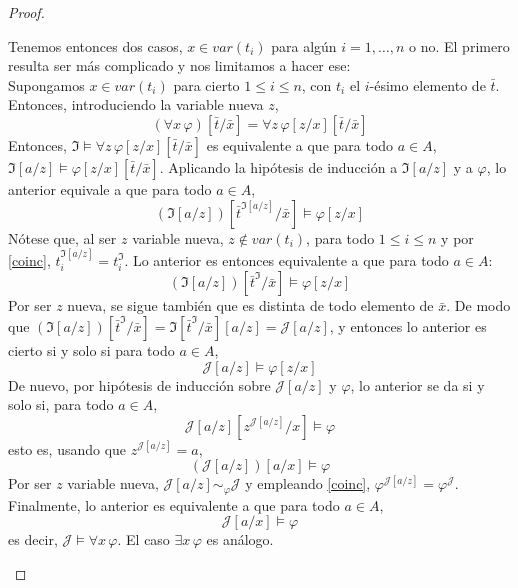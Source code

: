 \begin{proof}
\begin{enumerate}
\begin{itemize}
\begin{itemize}
    Tenemos entonces dos casos, $x \in var(t_i)$ para algún $i=1,\dots,n$ o no. El primero resulta ser más complicado y nos limitamos a hacer ese:\\
    Supongamos $x \in var(t_i)$ para cierto $1 \leq i \leq n$, con $t_i$ el $i$-ésimo elemento de $\bar{t}$. Entonces, introduciendo la variable nueva $z$, 
    $$(\forall x \, \varphi)[\bar{t}/\bar{x}] = \forall z \, \varphi[z/x][\bar{t}/\bar{x}]$$
    Entonces, $\mathfrak{I} \vDash \forall z \, \varphi[z/x][\bar{t}/\bar{x}]$ es equivalente a que para todo $a \in A$, $\mathfrak{I}[a/z] \vDash \varphi[z/x][\bar{t}/\bar{x}]$. Aplicando la hipótesis de inducción a $\mathfrak{I}[a/z]$ y a $\varphi$, lo anterior equivale a que para todo $a \in A$,
    $$(\mathfrak{I}[a/z])[\bar{t}^{\mathfrak{I}[a/z]}/\bar{x}] \vDash \varphi[z/x]$$
    Nótese que, al ser $z$ variable nueva, $z \notin var(t_i)$, para todo $1 \leq i \leq n$ y por \ref{coinc}, $t_i^{\mathfrak{I}[a/z]} = t_i^{\mathfrak{I}}$. Lo anterior es entonces equivalente a que para todo $a \in A$:
    $$(\mathfrak{I}[a/z])[\bar{t}^{\mathfrak{I}}/\bar{x}] \vDash \varphi[z/x]$$
    Por ser $z$ nueva, se sigue también que es distinta de todo elemento de $\bar{x}$. De modo que
    $(\mathfrak{I}[a/z])[\bar{t}^{\mathfrak{I}}/\bar{x}] = \mathfrak{I}[\bar{t}^{\mathfrak{I}}/\bar{x}][a/z] = \mathcal{J}[a/z]$, y entonces lo anterior es cierto si y solo si para todo $a \in A$, 
    $$\mathcal{J}[a/z] \vDash \varphi[z/x]$$
    De nuevo, por hipótesis de inducción sobre $\mathcal{J}[a/z]$ y $\varphi$, lo anterior se da si y solo si, para todo $a \in A$,
    $$\mathcal{J}[a/z][z^{\mathcal{J}[a/z]}/x] \vDash \varphi$$
    esto es, usando que $z^{\mathcal{J}[a/z]} = a$, 
    $$(\mathcal{J}[a/z])[a/x] \vDash \varphi$$
    Por ser $z$ variable nueva, $\mathcal{J}[a/z] \sim_{\varphi} \mathcal{J}$ y empleando \ref{coinc}, $\varphi^{\mathcal{J}[a/z]} = \varphi^{\mathcal{J}}$. Finalmente, lo anterior es equivalente a que para todo $a \in A$,
    $$\mathcal{J}[a/x] \vDash \varphi$$
    es decir, $\mathcal{J} \vDash \forall x \, \varphi$.
    El caso $\exists x \, \varphi$ es análogo.
                    \end{itemize}
        \end{itemize}
    
\end{enumerate}
\end{proof}